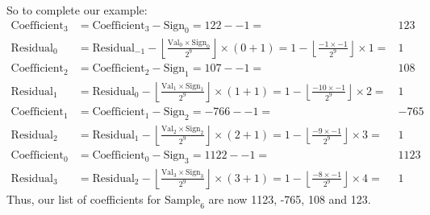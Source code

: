 So to complete our example:
\begin{align*}
\text{Coefficient}_3 &= \text{Coefficient}_3 - \text{Sign}_0 = 122 - -1 =& 123 \\
\text{Residual}_0 &= \text{Residual}_{-1} - \left\lfloor\frac{\text{Val}_0 \times \text{Sign}_0}{2 ^ 9}\right\rfloor \times (0 + 1) = 1 - \left\lfloor\frac{-1 \times -1}{2 ^ 9}\right\rfloor \times 1 =& 1 \\
\text{Coefficient}_2 &= \text{Coefficient}_2 - \text{Sign}_1 = 107 - -1 =& 108 \\
\text{Residual}_1 &= \text{Residual}_0 - \left\lfloor\frac{\text{Val}_1 \times \text{Sign}_1}{2 ^ 9}\right\rfloor \times (1 + 1) = 1 - \left\lfloor\frac{-10 \times -1}{2 ^ 9}\right\rfloor \times 2 =& 1 \\
\text{Coefficient}_1 &= \text{Coefficient}_1 - \text{Sign}_2 = -766 - -1 =& -765 \\
\text{Residual}_2 &= \text{Residual}_1 - \left\lfloor\frac{\text{Val}_2 \times \text{Sign}_2}{2 ^ 9}\right\rfloor \times (2 + 1) = 1 - \left\lfloor\frac{-9 \times -1}{2 ^ 9}\right\rfloor \times 3 =& 1 \\
\text{Coefficient}_0 &= \text{Coefficient}_0 - \text{Sign}_3 = 1122 - -1 =& 1123 \\
\text{Residual}_3 &= \text{Residual}_2 - \left\lfloor\frac{\text{Val}_3 \times \text{Sign}_3}{2 ^ 9}\right\rfloor \times (3 + 1) = 1 - \left\lfloor\frac{-8 \times -1}{2 ^ 9}\right\rfloor \times 4 =& 1
\end{align*}
Thus, our list of coefficients for $\text{Sample}_6$ are now
1123, -765, 108 and 123.

\clearpage

